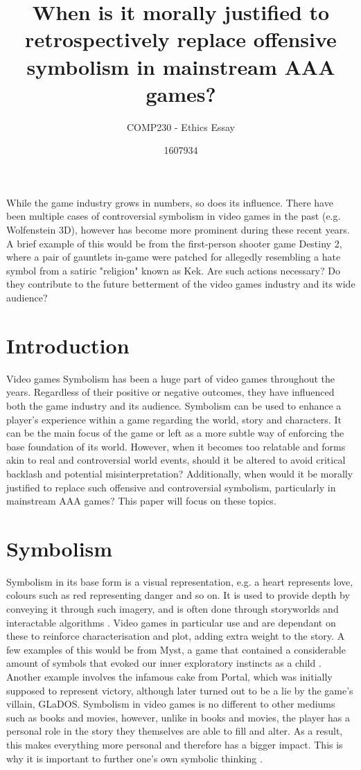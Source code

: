 \documentclass{scrartcl}
\title{When is it morally justified to retrospectively replace offensive symbolism in mainstream AAA games?}
\subtitle{COMP230 - Ethics Essay}
\author{1607934}
\begin{document}
\maketitle

\abstract{} 
While the game industry grows in numbers, so does its influence. There have been multiple cases of controversial symbolism in video games in the past (e.g. Wolfenstein 3D), however has become more prominent during these recent years. A brief example of this would be from the first-person shooter game Destiny 2, where a pair of gauntlets in-game were patched for allegedly resembling a hate symbol from a satiric "religion" known as Kek. Are such actions necessary? Do they contribute to the future betterment of the video games industry and its wide audience?

\section{Introduction}
Video games Symbolism has been a huge part of video games throughout the years. Regardless of their positive or negative outcomes, they have influenced both the game industry and its audience. Symbolism can be used to enhance a player's experience within a game regarding the world, story and characters. It can be the main focus of the game or left as a more subtle way of enforcing the base foundation of its world. However, when it becomes too relatable and forms akin to real and controversial world events, should it be altered to avoid critical backlash and potential misinterpretation? Additionally, when would it be morally justified to replace such offensive and controversial symbolism, particularly in mainstream AAA games? This paper will focus on these topics.


\section{Symbolism}
Symbolism in its base form is a visual representation, e.g. a heart represents love, colours such as red representing danger and so on. It is used to provide depth by conveying it through such imagery, and is often done through storyworlds and interactable algorithms \cite{Bruchansky} \cite{nieva}. Video games in particular use and are dependant on these to reinforce characterisation and plot, adding extra weight to the story. A few examples of this would be from Myst, a game that contained a considerable amount of symbols that evoked our inner exploratory instincts as a child \cite{xander}. Another example involves the infamous cake from Portal, which was initially supposed to represent victory, although later turned out to be a lie by the game's villain, GLaDOS. Symbolism in video games is no different to other mediums such as books and movies, however, unlike in books and movies, the player has a personal role in the story they themselves are able to fill and alter. As a result, this makes everything more personal and therefore has a bigger impact. This is why it is important to further one's own symbolic thinking \cite{jefforkin}.
\end{document}
